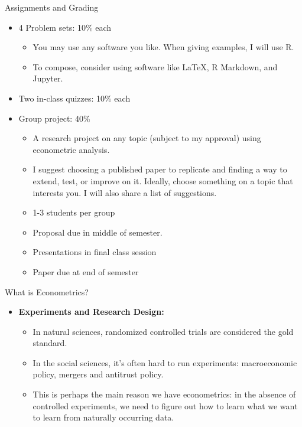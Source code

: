 \begin{frame}{Assignments and Grading}
\begin{itemize}
	\item 4 Problem sets: 10\% each
		\begin{itemize}
		\item You may use any software you like. When giving examples, I will use R.
		\item To compose, consider using software like LaTeX, R Markdown, and Jupyter.
	\end{itemize}

	\smallskip
	\item Two in-class quizzes: 10\% each


	\smallskip
	\item Group project: 40\%
	\begin{itemize}
		\item A research project on any topic (subject to my approval) using econometric analysis.
		\item I suggest choosing a published paper to replicate and finding a way to extend, test, or improve on it.  
		Ideally, choose something on a topic that interests you. I will also share a list of suggestions. 
		\item 1-3 students per group
		\item Proposal due in middle of semester. 
		\item Presentations in final class session
		\item Paper due at end of semester
	\end{itemize}

\end{itemize}
\end{frame}







\begin{frame}{What is Econometrics?}
\begin{itemize}
	\item {\bf Experiments and Research Design:}
	\begin{itemize}
			\item In natural sciences, randomized controlled trials are considered the gold standard.
			\medskip
			\item In the social sciences, it's often hard to run experiments: macroeconomic policy, 
			mergers and antitrust policy.
			\medskip
			\item This is perhaps the main reason we have econometrics: in the absence of controlled 
			experiments, we need to figure out how to learn what we want to learn from naturally 
			occurring data.
	\end{itemize}
\end{itemize}
\end{frame}	
	
